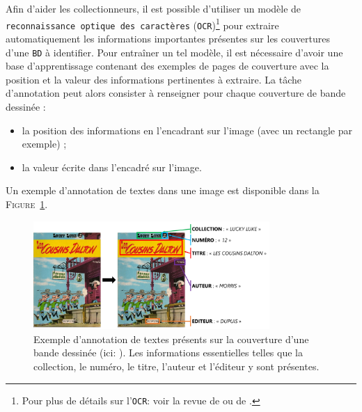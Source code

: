 			Afin d'aider les collectionneurs, il est possible d'utiliser un modèle de \texttt{reconnaissance optique des caractères} (\texttt{OCR})\footnote{
				Pour plus de détails sur l'\texttt{OCR}: voir la revue de \cite{berchmans-kumar:2014:optical-character-recognition} ou de \cite{awel-abidi:2019:review-optical-character}.
			} pour extraire automatiquement les informations importantes présentes sur les couvertures d'une \texttt{BD} à identifier.
			Pour entraîner un tel modèle, il est nécessaire d'avoir une base d'apprentissage contenant des exemples de pages de couverture avec la position et la valeur des informations pertinentes à extraire.
			La tâche d'annotation peut alors consister à renseigner pour chaque couverture de bande dessinée :
			\begin{itemize}
				\item la position des informations en l'encadrant sur l'image (avec un rectangle par exemple) ;
				\item la valeur écrite dans l'encadré sur l'image.
			\end{itemize}
			
			Un exemple d'annotation de textes dans une image est disponible dans la \textsc{Figure~\ref{figure:2.1.2.C-PRESENTATION-ANNOTATION-EXEMPLES-EXTRACTION}}.
			\begin{leftBarExamples}
				\begin{figure}[H]
					\centering
					\includegraphics[width=0.80\textwidth]{figures/etatdelart-morris-1958-lucky-luke-12}
					\caption{
						Exemple d'annotation de textes présents sur la couverture d'une bande dessinée (ici: \cite{morris-goscinny:1958:cousins-dalton}).
						Les informations essentielles telles que la collection, le numéro, le titre, l'auteur et l'éditeur y sont présentes. 
					}
					\label{figure:2.1.2.C-PRESENTATION-ANNOTATION-EXEMPLES-EXTRACTION}
				\end{figure}
			\end{leftBarExamples}
			
